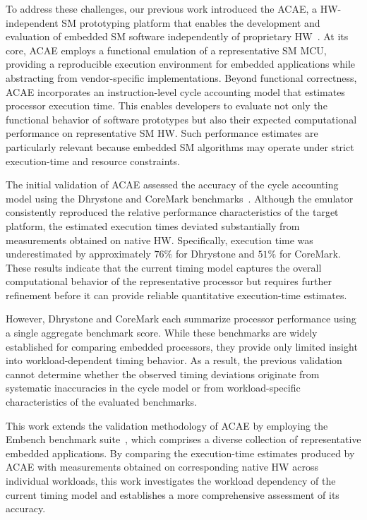 \documentclass[conference]{IEEEtran}
\begin{document}
		To address these challenges, our previous work introduced the \ac{ACAE}, a \ac{HW}-independent \ac{SM} prototyping platform that enables the development and evaluation of embedded \ac{SM} software independently of proprietary \ac{HW}~\cite{ACAE-REPO}.
		At its core, \ac{ACAE} employs a functional emulation of a representative \ac{SM} \ac{MCU}, providing a reproducible execution environment for embedded applications while abstracting from vendor-specific implementations.
		Beyond functional correctness, \ac{ACAE} incorporates an instruction-level cycle accounting model that estimates processor execution time.
		This enables developers to evaluate not only the functional behavior of software prototypes but also their expected computational performance on representative \ac{SM} \ac{HW}.
		Such performance estimates are particularly relevant because embedded \ac{SM} algorithms may operate under strict execution-time and resource constraints.

		The initial validation of \ac{ACAE} assessed the accuracy of the cycle accounting model using the Dhrystone and CoreMark benchmarks~\cite{ACAE-REPO}.
		Although the emulator consistently reproduced the relative performance characteristics of the target platform, the estimated execution times deviated substantially from measurements obtained on native \ac{HW}.
		Specifically, execution time was underestimated by approximately $76\%$ for Dhrystone and $51\%$ for CoreMark.
		These results indicate that the current timing model captures the overall computational behavior of the representative processor but requires further refinement before it can provide reliable quantitative execution-time estimates.

		However, Dhrystone and CoreMark each summarize processor performance using a single aggregate benchmark score.
		While these benchmarks are widely established for comparing embedded processors, they provide only limited insight into workload-dependent timing behavior.
		As a result, the previous validation cannot determine whether the observed timing deviations originate from systematic inaccuracies in the cycle model or from workload-specific characteristics of the evaluated benchmarks.

		This work extends the validation methodology of \ac{ACAE} by employing the Embench benchmark suite~\cite{EMBENCH-REPO, patterson2019embench}, which comprises a diverse collection of representative embedded applications.
		By comparing the execution-time estimates produced by \ac{ACAE} with measurements obtained on corresponding native \ac{HW} across individual workloads, this work investigates the workload dependency of the current timing model and establishes a more comprehensive assessment of its accuracy.
\end{document}
